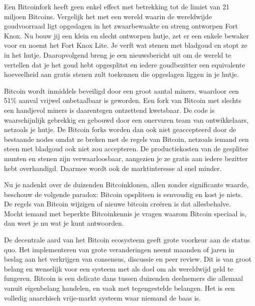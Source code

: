 Een Bitcoinfork heeft geen enkel effect met betrekking tot de limiet van 21 miljoen Bitcoins. Vergelijk het met een wereld waarin de wereldwijde goudvoorraad ligt opgeslagen in het zwaarbewaakte en streng ontworpen Fort Knox. Nu bouw jij een klein en slecht ontworpen hutje, zet er een enkele bewaker voor en noemt het Fort Knox Lite. Je verft wat stenen met bladgoud en stopt ze in het hutje. Daaropvolgend breng je een nieuwsbericht uit om de wereld te vertellen dat je het goud hebt opgesplitst en iedere goudbezitter een equivalente hoeveelheid aan gratis stenen zult toekennen die opgeslagen liggen in je hutje. 

Bitcoin wordt inmiddels beveiligd door een groot aantal miners, waardoor een 51\% aanval vrijwel onbetaalbaar is geworden. Een fork van Bitcoin met slechts een handjevol miners is daarentegen ontzettend kwetsbaar. De code is waarschijnlijk gebrekkig en gebouwd door een onervaren team van ontwikkelaars, netzoals je hutje. De Bitcoin forks worden dan ook niet geaccepteerd door de bestaande nodes omdat ze breken met de regels van Bitcoin, netzoals iemand een steen met bladgoud ook niet zou accepteren. De productiekosten van de gesplitse munten en stenen zijn verwaarloosbaar, aangezien je ze gratis aan iedere bezitter hebt overhandigd. Daarmee wordt ook de marktinteresse al snel minder.

Nu je nadenkt over de duizenden Bitcoinklonen, allen zonder significante waarde, beschouw de volgende paradox: Bitcoin opsplitsen is eenvoudig en kost je niets. De regels van Bitcoin wijzigen of nieuwe bitcoin creëren is dat allesbehalve. Mocht iemand met beperkte Bitcoinkennis je vragen waarom Bitcoin speciaal is, dan weet je nu wat je kunt antwoorden.

De decentrale aard van het Bitcoin ecosysteem geeft grote voorkeur aan de status quo. Het implementeren van grote veranderingen neemt maanden of jaren in beslag aan het verkrijgen van consensus, discussie en peer review. Dit is van groot belang en wenselijk voor een systeem met als doel om als wereldwijd geld te fungeren. Bitcoin is een delicate dans tussen duizenden deelnemers die allemaal vanuit eigenbelang handelen, en vaak met tegengestelde belangen. Het is een volledig anarchisch vrije-markt systeem waar niemand de baas is. 


